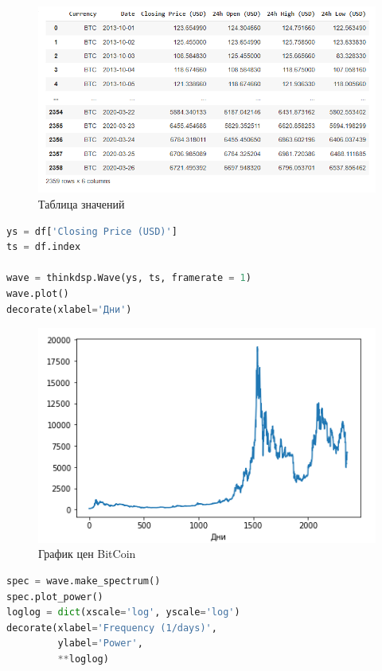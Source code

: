 \begin{figure}[H]
	\begin{center}
		\includegraphics[scale=1]{fig/lab04/lab04_07.png}
		\caption{Таблица значений}
	\end{center}
\end{figure}

\begin{lstlisting}[language=Python]
ys = df['Closing Price (USD)']
ts = df.index

wave = thinkdsp.Wave(ys, ts, framerate = 1)
wave.plot()
decorate(xlabel='Дни')
\end{lstlisting}

\begin{figure}[H]
	\begin{center}
		\includegraphics[scale=1]{fig/lab04/lab04_08.png}
		\caption{График цен BitCoin}
	\end{center}
\end{figure}

\begin{lstlisting}[language=Python]
spec = wave.make_spectrum()
spec.plot_power()
loglog = dict(xscale='log', yscale='log')
decorate(xlabel='Frequency (1/days)',
         ylabel='Power', 
         **loglog)
\end{lstlisting}

